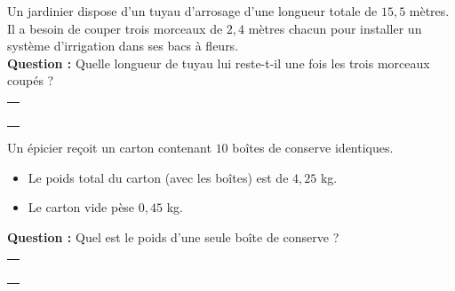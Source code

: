 \documentclass[a4paper]{book}
\begin{document}
    
    \begin{exercice}
        Un jardinier dispose d'un tuyau d'arrosage d'une longueur totale de $15,5$ mètres. Il a besoin de couper trois morceaux de $2,4$ mètres chacun pour installer un système d'irrigation dans ses bacs à fleurs. \\
        \textbf{Question :} Quelle longueur de tuyau lui reste-t-il une fois les trois morceaux coupés ?

        \begin{tabular}{|p{16cm}|}
            \hline \\ \\ \\ \\ \\ \hline            
        \end{tabular}
    \end{exercice}

    
    \begin{exercice}    
        Un épicier reçoit un carton contenant $10$ boîtes de conserve identiques. 
        \begin{itemize}
            \item Le poids total du carton (avec les boîtes) est de $4,25$ kg.
            \item Le carton vide pèse $0,45$ kg.
        \end{itemize}
        \textbf{Question :} Quel est le poids d'une seule boîte de conserve ?

        \begin{tabular}{|p{16cm}|}
            \hline \\ \\ \\ \\ \\ \hline            
        \end{tabular}
    \end{exercice}
\end{document}

